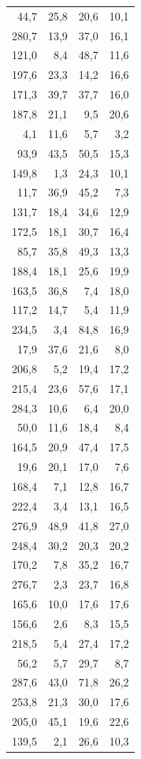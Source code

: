 \documentclass[
  letterpaper,
  DIV=11,
  numbers=noendperiod]{scrreprt}
\begin{document}
\begin{longtable*}{rrrr}
44,7 & 25,8 & 20,6 & 10,1 \\ 
280,7 & 13,9 & 37,0 & 16,1 \\ 
121,0 & 8,4 & 48,7 & 11,6 \\ 
197,6 & 23,3 & 14,2 & 16,6 \\ 
171,3 & 39,7 & 37,7 & 16,0 \\ 
187,8 & 21,1 & 9,5 & 20,6 \\ 
4,1 & 11,6 & 5,7 & 3,2 \\ 
93,9 & 43,5 & 50,5 & 15,3 \\ 
149,8 & 1,3 & 24,3 & 10,1 \\ 
11,7 & 36,9 & 45,2 & 7,3 \\ 
131,7 & 18,4 & 34,6 & 12,9 \\ 
172,5 & 18,1 & 30,7 & 16,4 \\ 
85,7 & 35,8 & 49,3 & 13,3 \\ 
188,4 & 18,1 & 25,6 & 19,9 \\ 
163,5 & 36,8 & 7,4 & 18,0 \\ 
117,2 & 14,7 & 5,4 & 11,9 \\ 
234,5 & 3,4 & 84,8 & 16,9 \\ 
17,9 & 37,6 & 21,6 & 8,0 \\ 
206,8 & 5,2 & 19,4 & 17,2 \\ 
215,4 & 23,6 & 57,6 & 17,1 \\ 
284,3 & 10,6 & 6,4 & 20,0 \\ 
50,0 & 11,6 & 18,4 & 8,4 \\ 
164,5 & 20,9 & 47,4 & 17,5 \\ 
19,6 & 20,1 & 17,0 & 7,6 \\ 
168,4 & 7,1 & 12,8 & 16,7 \\ 
222,4 & 3,4 & 13,1 & 16,5 \\ 
276,9 & 48,9 & 41,8 & 27,0 \\ 
248,4 & 30,2 & 20,3 & 20,2 \\ 
170,2 & 7,8 & 35,2 & 16,7 \\ 
276,7 & 2,3 & 23,7 & 16,8 \\ 
165,6 & 10,0 & 17,6 & 17,6 \\ 
156,6 & 2,6 & 8,3 & 15,5 \\ 
218,5 & 5,4 & 27,4 & 17,2 \\ 
56,2 & 5,7 & 29,7 & 8,7 \\ 
287,6 & 43,0 & 71,8 & 26,2 \\ 
253,8 & 21,3 & 30,0 & 17,6 \\ 
205,0 & 45,1 & 19,6 & 22,6 \\ 
139,5 & 2,1 & 26,6 & 10,3 \\ 

\end{longtable*}
\end{document}
